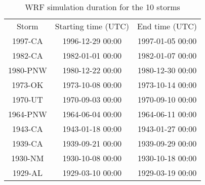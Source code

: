 \begin{table}[htbp]
	\centering
	\caption{WRF simulation duration for the 10 storms}
	\begin{tabular}{ccc}
		\hline
		Storm & Starting time (UTC) & End time (UTC)\\
		1997-CA  & 1996-12-29 00:00 & 1997-01-05 00:00\\
		1982-CA  & 1982-01-01 00:00 & 1982-01-07 00:00\\
		1980-PNW & 1980-12-22 00:00 & 1980-12-30 00:00\\
		1973-OK  & 1973-10-08 00:00 & 1973-10-14 00:00\\
		1970-UT  & 1970-09-03 00:00 & 1970-09-10 00:00\\
		1964-PNW & 1964-06-04 00:00 & 1964-06-11 00:00\\
		1943-CA  & 1943-01-18 00:00 & 1943-01-27 00:00\\
		1939-CA  & 1939-09-21 00:00 & 1939-09-29 00:00\\
		1930-NM  & 1930-10-08 00:00 & 1930-10-18 00:00\\
		1929-AL  & 1929-03-10 00:00 & 1929-03-19 00:00\\
		\hline
	\end{tabular}
	\label{table:3-S2}
\end{table}
